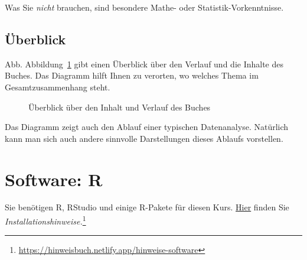 \documentclass[
  a4paper,
  DIV=11]{scrreprt}
\theoremstyle{definition}
\theoremstyle{definition}
\theoremstyle{definition}
\theoremstyle{remark}
\begin{document}
Was Sie \emph{nicht} brauchen, sind besondere Mathe- oder
Statistik-Vorkenntnisse.

\subsection{Überblick}\label{uxfcberblick}

Abb. Abbildung~\ref{fig-ueberblick} gibt einen Überblick über den
Verlauf und die Inhalte des Buches. Das Diagramm hilft Ihnen zu
verorten, wo welches Thema im Gesamtzusammenhang steht.

\begin{figure}


\caption{\label{fig-ueberblick}Überblick über den Inhalt und Verlauf des
Buches}

\end{figure}%

Das Diagramm zeigt auch den Ablauf einer typischen Datenanalyse.
Natürlich kann man sich auch andere sinnvolle Darstellungen dieses
Ablaufs vorstellen.

\section{Software: R}\label{software-r}

Sie benötigen R, RStudio und einige R-Pakete für diesen Kurs.
\href{https://hinweisbuch.netlify.app/hinweise-software}{Hier} finden
Sie \emph{Installationshinweise.}\footnote{\url{https://hinweisbuch.netlify.app/hinweise-software}}
\end{document}
